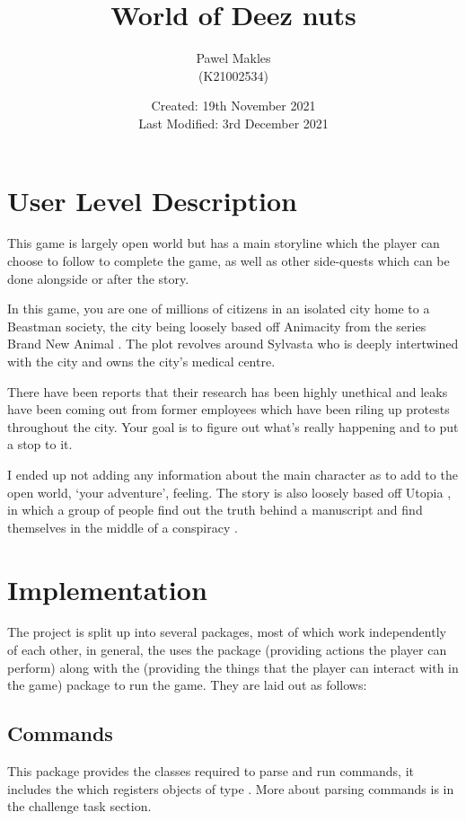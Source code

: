 \documentclass{article}
\title{World of Deez nuts}
\author{Pawel Makles \\ \small (K21002534)}
\date{\small Created: 19th November 2021 \\ Last Modified: 3rd December 2021}
\begin{document}
\maketitle

    \begin{multicols}{2}
        \section{User Level Description}
        This game is largely open world but has a main storyline which the player can choose to follow to complete the game, as well as other side-quests which can be done alongside or after the story.

        In this game, you are one of millions of citizens in an isolated city home to a Beastman \cite{beastman} society, the city being loosely based off Animacity \cite{animacity} from the series Brand New Animal \cite{bna}. The plot revolves around Sylvasta who is deeply intertwined with the city and owns the city's medical centre.

        There have been reports that their research has been highly unethical and leaks have been coming out from former employees which have been riling up protests throughout the city. Your goal is to figure out what's really happening and to put a stop to it.

        I ended up not adding any information about the main character as to add to the open world, `your adventure', feeling. The story is also loosely based off Utopia \cite{utopia}, in which a group of people find out the truth behind a manuscript and find themselves in the middle of a conspiracy \cite{pyrocynical}.
        
        \section{Implementation}
        The project is split up into several packages, most of which work independently of each other, in general, the  uses the  package (providing actions the player can perform) along with the  (providing the things that the player can interact with in the game) package to run the game. They are laid out as follows:
        
            \subsection{Commands}
            This package provides the classes required to parse and run commands, it includes the  which registers objects of type . More about parsing commands is in the challenge task section.


\end{multicols}
\end{document}
